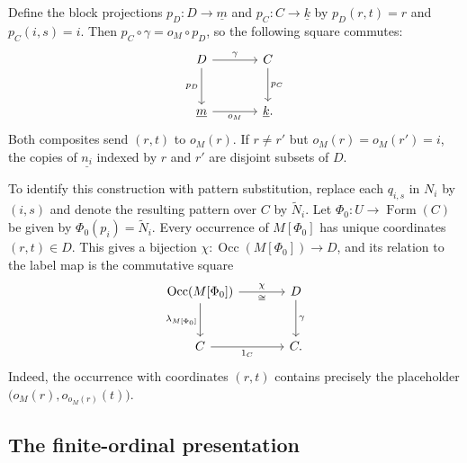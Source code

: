 \documentclass[11pt]{article}
\newcommand{\Occ}{\operatorname{Occ}}
\newcommand{\FormulaSet}{\operatorname{Form}}
\begin{document}
Define the block projections $p_D:D\to\underline m$ and
$p_C:C\to\underline k$ by $p_D(r,t)=r$ and $p_C(i,s)=i$.
Then $p_C\circ\gamma=o_M\circ p_D$, so the following square commutes:
\begin{equation}\label{eq:app-profile}
\begin{tikzcd}[column sep=large,row sep=large]
 D\arrow[r,"\gamma"]\arrow[d,"p_D"']&C\arrow[d,"p_C"]\\
 \underline m\arrow[r,"o_M"']&\underline k.
\end{tikzcd}
\end{equation}
Both composites send $(r,t)$ to $o_M(r)$.
If $r\ne r'$ but $o_M(r)=o_M(r')=i$, the copies of
$\underline{n_i}$ indexed by $r$ and $r'$ are disjoint subsets
of $D$.

To identify this construction with pattern substitution,
replace each $q_{i,s}$ in $N_i$ by $(i,s)$ and denote the resulting
pattern over $C$ by $\widetilde N_i$. Let
$\Phi_0:U\to\FormulaSet(C)$ be given by $\Phi_0(p_i)=\widetilde N_i$.
Every occurrence of $M[\Phi_0]$ has unique coordinates $(r,t)\in D$.
This gives a bijection $\chi:\Occ(M[\Phi_0])\to D$, and its relation
to the label map is the commutative square
\begin{equation}\label{eq:app-occurrence-labels}
\begin{tikzcd}[column sep=large,row sep=large]
 \Occ(M[\Phi_0])\arrow[r,"\chi","\cong"']
    \arrow[d,"\lambda_{M[\Phi_0]}"']&D\arrow[d,"\gamma"]\\
 C\arrow[r,"1_C"']&C.
\end{tikzcd}
\end{equation}
Indeed, the occurrence with coordinates $(r,t)$ contains precisely
the placeholder $\bigl(o_M(r),o_{o_M(r)}(t)\bigr)$.

\subsection{The finite-ordinal presentation}\label{app:ordinals}
\end{document}
